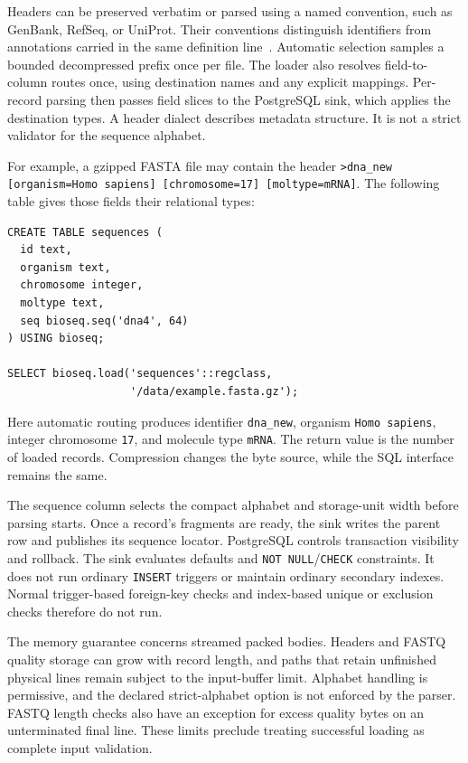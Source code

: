 Headers can be preserved verbatim or parsed using a named convention, such as
GenBank, RefSeq, or UniProt. Their conventions distinguish identifiers from
annotations carried in the same definition
line~\autocite{ncbiFastaFormat,uniprotFastaHeaders}. Automatic selection samples
a bounded decompressed prefix once per file. The loader also resolves field-to-column routes once,
using destination names and any explicit mappings. Per-record parsing then
passes field slices to the PostgreSQL sink, which applies the destination
types. A header dialect describes metadata structure. It is not a strict
validator for the sequence alphabet.

For example, a gzipped FASTA file may contain the header
\texttt{>dna\_new [organism=Homo sapiens] [chromosome=17] [moltype=mRNA]}.
The following table gives those fields their relational types:

\noindent\begin{minipage}{\linewidth}
\begin{lstlisting}[style=bioseq-arch-sql,basicstyle=\ttfamily\footnotesize,
  caption={Load a FASTA file with GenBank-style header fields.},
  label={lst:arch-load-genbank}]
CREATE TABLE sequences (
  id text,
  organism text,
  chromosome integer,
  moltype text,
  seq bioseq.seq('dna4', 64)
) USING bioseq;

SELECT bioseq.load('sequences'::regclass,
                   '/data/example.fasta.gz');
\end{lstlisting}
\end{minipage}

Here automatic routing produces identifier \texttt{dna\_new}, organism
\texttt{Homo sapiens}, integer chromosome \texttt{17}, and molecule type
\texttt{mRNA}. The return value is the number of loaded records. Compression
changes the byte source, while the SQL interface remains the same.

The sequence column selects the compact alphabet and storage-unit width
before parsing starts. Once a record's fragments are ready, the sink writes
the parent row and publishes its sequence locator. PostgreSQL controls
transaction visibility and rollback. The sink evaluates defaults and
\texttt{NOT NULL}/\texttt{CHECK} constraints. It does not run ordinary
\texttt{INSERT} triggers or maintain ordinary secondary indexes. Normal
trigger-based foreign-key checks and index-based unique or exclusion checks
therefore do not run.

\label{sec:arch-io-limits}
\label{sec:io-integrity-limits}
The memory guarantee concerns streamed packed bodies. Headers and FASTQ
quality storage can grow with record length, and paths that retain unfinished
physical lines remain subject to the input-buffer limit. Alphabet handling
is permissive, and the declared strict-alphabet option is not enforced by the
parser. FASTQ length checks also have an exception for excess quality bytes
on an unterminated final line. These limits preclude treating successful
loading as complete input validation.
